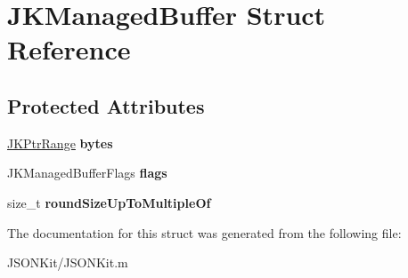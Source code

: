 \hypertarget{struct_j_k_managed_buffer}{\section{J\+K\+Managed\+Buffer Struct Reference}
\label{struct_j_k_managed_buffer}
}
\subsection*{Protected Attributes}
\begin{DoxyCompactItemize}
\item 
\hypertarget{struct_j_k_managed_buffer_a57af888785f75f4282fe68215655e146}{\hyperlink{struct_j_k_ptr_range}{J\+K\+Ptr\+Range} {\bfseries bytes}}\label{struct_j_k_managed_buffer_a57af888785f75f4282fe68215655e146}

\item 
\hypertarget{struct_j_k_managed_buffer_a38a499c041d11c99bc175f53c3700c5a}{J\+K\+Managed\+Buffer\+Flags {\bfseries flags}}\label{struct_j_k_managed_buffer_a38a499c041d11c99bc175f53c3700c5a}

\item 
\hypertarget{struct_j_k_managed_buffer_ad45389f30f38ea703e116ba4f7496fc2}{size\+\_\+t {\bfseries round\+Size\+Up\+To\+Multiple\+Of}}\label{struct_j_k_managed_buffer_ad45389f30f38ea703e116ba4f7496fc2}

\end{DoxyCompactItemize}


The documentation for this struct was generated from the following file\+:\begin{DoxyCompactItemize}
\item 
J\+S\+O\+N\+Kit/J\+S\+O\+N\+Kit.\+m\end{DoxyCompactItemize}
